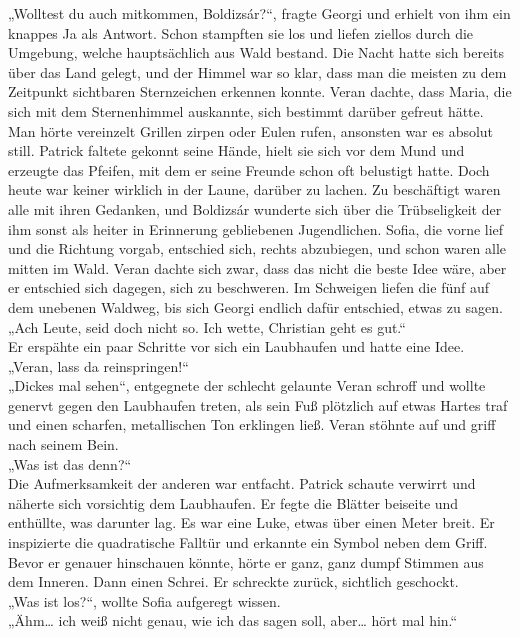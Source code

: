 \documentclass[oneside]{memoir}
\begin{document}
„Wolltest du auch mitkommen, Boldizsár?“, fragte Georgi und erhielt von ihm ein knappes Ja als Antwort. Schon stampften sie los und liefen ziellos durch die Umgebung, welche hauptsächlich aus Wald bestand. Die Nacht hatte sich bereits über das Land gelegt, und der Himmel war so klar, dass man die meisten zu dem Zeitpunkt sichtbaren Sternzeichen erkennen konnte. Veran dachte, dass Maria, die sich mit dem Sternenhimmel auskannte, sich bestimmt darüber gefreut hätte. Man hörte vereinzelt Grillen zirpen oder Eulen rufen, ansonsten war es absolut still. Patrick faltete gekonnt seine Hände, hielt sie sich vor dem Mund und erzeugte das Pfeifen, mit dem er seine Freunde schon oft belustigt hatte. Doch heute war keiner wirklich in der Laune, darüber zu lachen. Zu beschäftigt waren alle mit ihren Gedanken, und Boldizsár wunderte sich über die Trübseligkeit der ihm sonst als heiter in Erinnerung gebliebenen Jugendlichen. Sofia, die vorne lief und die Richtung vorgab, entschied sich, rechts abzubiegen, und schon waren alle mitten im Wald. Veran dachte sich zwar, dass das nicht die beste Idee wäre, aber er entschied sich dagegen, sich zu beschweren. Im Schweigen liefen die fünf auf dem unebenen Waldweg, bis sich Georgi endlich dafür entschied, etwas zu sagen. \\
„Ach Leute, seid doch nicht so. Ich wette, Christian geht es gut.“ \\
Er erspähte ein paar Schritte vor sich ein Laubhaufen und hatte eine Idee. \\
„Veran, lass da reinspringen!“ \\
„Dickes mal sehen“, entgegnete der schlecht gelaunte Veran schroff und wollte genervt gegen den Laubhaufen treten, als sein Fuß plötzlich auf etwas Hartes traf und einen scharfen, metallischen Ton erklingen ließ.
Veran stöhnte auf und griff nach seinem Bein. \\
„Was ist das denn?“ \\
Die Aufmerksamkeit der anderen war entfacht. Patrick schaute verwirrt und näherte sich vorsichtig dem Laubhaufen. Er fegte die Blätter beiseite und enthüllte, was darunter lag. Es war eine Luke, etwas über einen Meter breit. Er inspizierte die quadratische Falltür und erkannte ein Symbol neben dem Griff. Bevor er genauer hinschauen könnte, hörte er ganz, ganz dumpf Stimmen aus dem Inneren. Dann einen Schrei. Er schreckte zurück, sichtlich geschockt. \\
„Was ist los?“, wollte Sofia aufgeregt wissen. \\
„Ähm\ldots{} ich weiß nicht genau, wie ich das sagen soll, aber\ldots{} hört mal hin.“ \\
\end{document}
